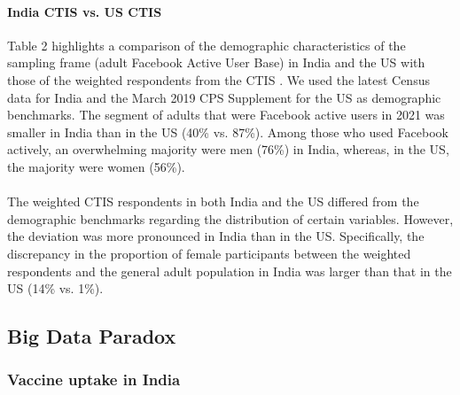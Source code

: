 \documentclass{article}
\begin{document}
\paragraph{India CTIS vs. US CTIS} Table 2 highlights a comparison of the demographic characteristics of the sampling frame (adult Facebook Active User Base) in India and the US with those of the weighted respondents from the CTIS \citep{facebook2021}. We used the latest Census data for India and the March 2019 CPS Supplement for the US as demographic benchmarks. The segment of adults that were Facebook active users in 2021 was smaller in India than in the US (40\% vs. 87\%). Among those who used Facebook actively, an overwhelming majority were men (76\%) in India, whereas, in the US, the majority were women (56\%). 
\\
\\
The weighted CTIS respondents in both India and the US differed from the demographic benchmarks regarding the distribution of certain variables. However, the deviation was more pronounced in India than in the US. Specifically, the discrepancy in the proportion of female participants between the weighted respondents and the general adult population in India was larger than that in the US (14\% vs. 1\%). 

\subsection{Big Data Paradox}

\subsubsection{Vaccine uptake in India}
\end{document}
